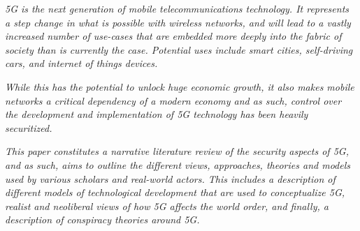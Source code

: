 \textit{5G is the next generation of mobile telecommunications technology. It
  represents a step change in what is possible with wireless networks, and will
  lead to a vastly increased number of use-cases that are embedded more deeply
  into the fabric of society than is currently the case. Potential uses include
  smart cities, self-driving cars, and internet of things devices.}

\textit{While this has the potential to unlock huge economic growth, it also makes
  mobile networks a critical dependency of a modern economy and as such, control
  over the development and implementation of 5G technology has been heavily
  securitized.}

\textit{This paper constitutes a narrative literature review of the security
  aspects of 5G, and as such, aims to outline the different views, approaches,
  theories and models used by various scholars and real-world actors. This
  includes a description of different models of technological development that
  are used to conceptualize 5G, realist and neoliberal views of how 5G affects
  the world order, and finally, a description of conspiracy theories around 5G.}
